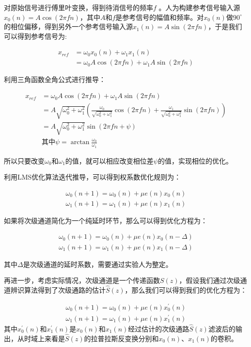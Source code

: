 \documentclass[12pt]{article}
\begin{document}
对原始信号进行傅里叶变换，得到待消信号的频率$f$ 。人为构建参考信号输入源$x_{0}(n)=A\cos(2\pi fn)$，其中$A$和$f$是参考信号的幅值和频率。对$x_{0}(n)$做$90^{\circ}$的相位偏移，得到另外一个参考信号输入源$x_{1}(n)=A\sin(2\pi fn)$，于是我们可以得到参考信号为:

\begin{align}
x_{ref} &= \omega_{0}x_{0}(n)+\omega_{1}x_{1}(n)  \nonumber \\
&= \omega_{0}A\cos(2\pi fn)+\omega_{1}A\sin(2\pi fn)
\end{align}

利用三角函数全角公式进行推导：

\begin{align}
x_{ref} &= \omega_{0}A\cos(2\pi fn)+\omega_{1}A\sin(2\pi fn) \nonumber \\
&=A\sqrt{\omega_{0}^{2}+\omega_{1}^{2}}\left(\frac{\omega_{0}}{\sqrt{\omega_{0}^{2}+\omega_{1}^{2}}}\cos(2\pi fn)+\frac{\omega_{1}}{\sqrt{\omega_{0}^{2}+\omega_{1}^{2}}}\sin(2\pi fn)\right) \nonumber \\
&=A\sqrt{\omega_{0}^{2}+\omega_{1}^{2}}\sin(2\pi fn+\psi) \\
&\mbox{其中}  \psi = \arctan\frac{\omega_{0}}{\omega_{1}} \nonumber
\end{align}

所以只要改变$\omega_{0}$和$\omega_{1}$的值，就可以相应改变相位差$\psi$的值，实现相位的优化。

利用LMS优化算法迭代推导，可以得到权系数优化规则为：

\begin{align}
\omega_{0}(n+1)=\omega_{0}(n) + \mu e(n)x_{0}(n) \nonumber \\
\omega_{1}(n+1)=\omega_{1}(n) + \mu e(n)x_{1}(n)
\end{align}

如果将次级通道简化为一个纯延时环节，那么可以得到优化方程为：

\begin{align}
\omega_{0}(n+1)=\omega_{0}(n) + \mu e(n)x_{0}(n-\Delta) \nonumber \\
\omega_{1}(n+1)=\omega_{1}(n) + \mu e(n)x_{1}(n-\Delta) 
\end{align}

其中$\Delta$是次级通道的延时系数，需要通过实验人为整定。

再进一步，考虑实际情况，次级通道是一个传递函数$S(z)$，假设我们通过次级通道辨识算法得到了次级通路的估计$\hat{S}(z)$，那么我们可以得到我们的优化方程为：

\begin{align}
\omega_{0}(n+1)=\omega_{0}(n) + \mu e(n)x^{\prime}_{0}(n) \nonumber \\
\omega_{1}(n+1)=\omega_{1}(n) + \mu e(n)x^{\prime}_{1}(n) 
\end{align}
其中$x^{\prime}_{0}(n)$和$x^{\prime}_{1}(n)$是$x_{0}(n)$和$x_{1}(n)$经过估计的次级通路$\hat{S}(z)$滤波后的输出，从时域上来看是$\hat{S}(z)$的拉普拉斯反变换分别和$x_{0}(n)$、$x_{1}(n)$的卷积。
\end{document}
